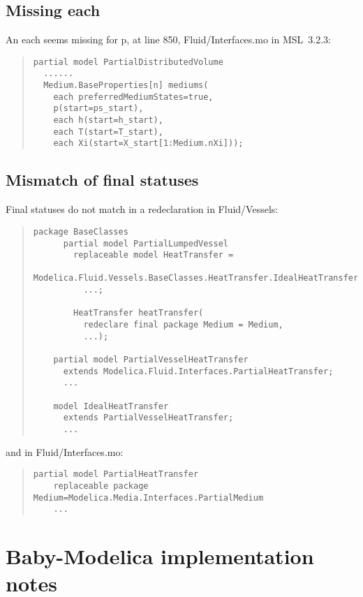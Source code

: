 \documentclass[10pt,b5paper]{article}
\begin{document}
\subsection{Missing each}

An each seems missing for p, at line 850, Fluid/Interfaces.mo in
MSL~3.2.3:
\begin{quote}
\begin{lstlisting}[aboveskip=-\baselineskip]
partial model PartialDistributedVolume
  ......
  Medium.BaseProperties[n] mediums(
    each preferredMediumStates=true,
    p(start=ps_start),
    each h(start=h_start),
    each T(start=T_start),
    each Xi(start=X_start[1:Medium.nXi]));
\end{lstlisting}
\end{quote}

\subsection{Mismatch of final statuses}

Final statuses do not match in a redeclaration in Fluid/Vessels:
\begin{quote}
\begin{lstlisting}[aboveskip=-\baselineskip]
  package BaseClasses
      partial model PartialLumpedVessel
        replaceable model HeatTransfer =
            Modelica.Fluid.Vessels.BaseClasses.HeatTransfer.IdealHeatTransfer
          ...;

        HeatTransfer heatTransfer(
          redeclare final package Medium = Medium,
          ...);

    partial model PartialVesselHeatTransfer
      extends Modelica.Fluid.Interfaces.PartialHeatTransfer;
      ...

    model IdealHeatTransfer
      extends PartialVesselHeatTransfer;
      ...
\end{lstlisting}
\end{quote}
and in Fluid/Interfaces.mo:
\begin{quote}
\begin{lstlisting}[aboveskip=-\baselineskip]
  partial model PartialHeatTransfer
    replaceable package Medium=Modelica.Media.Interfaces.PartialMedium
    ...
\end{lstlisting}
\end{quote}


\section{Baby-Modelica implementation notes}
\end{document}
